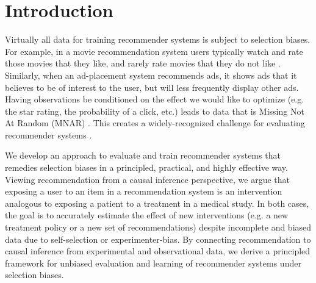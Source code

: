 \documentclass{article}
\begin{document}
 


\begin{abstract} 
Most data for evaluating and training recommender systems is subject to selection biases, either through self-selection by the users or through the actions of the recommendation system itself. In this paper, we provide a principled approach to handle selection biases by adapting models and estimation techniques from causal inference. The approach leads to unbiased performance estimators despite biased data, and to a matrix factorization method that provides substantially improved prediction performance on real-world data. We theoretically and empirically characterize the robustness of the approach, and find that it is highly practical and scalable.
\end{abstract} 

\section{Introduction}
Virtually all data for training recommender systems is subject to selection biases. For example, in a movie recommendation system users typically watch and rate those movies that they like, and rarely rate movies that they do not like \cite{pradel2012ranking}. Similarly, when an ad-placement system recommends ads, it shows ads that it believes to be of interest to the user, but will less frequently display other ads. Having observations be conditioned on the effect we would like to optimize (e.g. the star rating, the probability of a click, etc.) leads to data that is Missing Not At Random (MNAR) \cite{rubin2002mnar}. This creates a widely-recognized challenge for %
evaluating recommender systems \cite{Marlin/Zemel/09,de2014reducing}.

We develop an approach to evaluate and train recommender systems that remedies selection biases in a principled, practical, and highly effective way. Viewing recommendation from a causal inference perspective, we argue that exposing a user to an item in a recommendation system is an intervention analogous to exposing a patient to a treatment in a medical study. In both cases, the goal is to accurately estimate the effect of new interventions (e.g. a new treatment policy or a new set of recommendations) despite incomplete and biased data due to self-selection or experimenter-bias. By connecting recommendation to causal inference from experimental and observational data, we derive a principled framework for unbiased evaluation and learning of recommender systems under selection biases.
\end{document}
